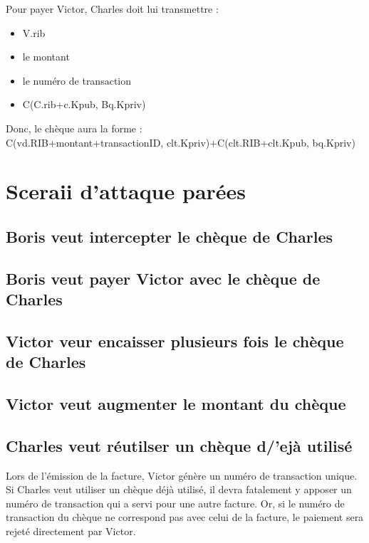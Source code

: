 \documentclass[oneside,10pt]{article}
\begin{document}
Pour payer Victor, Charles doit lui transmettre :
\begin{itemize}
\item V.rib
\item le montant
\item le num\'ero de transaction
\item C(C.rib+c.Kpub, Bq.Kpriv)
\end{itemize}
Donc, le ch\`eque aura la forme : \\C(vd.RIB+montant+transactionID, clt.Kpriv)+C(clt.RIB+clt.Kpub, bq.Kpriv)

\section{Sceraii d'attaque par\'ees}
\subsection{Boris veut intercepter le ch\`eque de Charles}

\subsection{Boris veut payer Victor avec le ch\`eque de Charles}

\subsection{Victor veur encaisser plusieurs fois le ch\`eque de Charles}

\subsection{Victor veut augmenter le montant du ch\`eque}

\subsection{Charles veut r\'eutilser un ch\`eque d/'ej\`a utilis\'e}
Lors de l'\'emission de la facture, Victor g\'en\`ere un num\'ero de transaction unique.
Si Charles veut utiliser un ch\`eque d\'ej\`a utilis\'e, il devra fatalement y apposer un num\'ero de transaction qui a servi pour une autre facture.
Or, si le num\'ero de transaction du ch\`eque ne correspond pas avec celui de la facture, le paiement sera rejet\'e directement par Victor.
\end{document}
